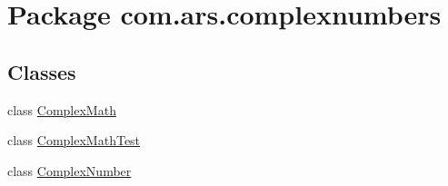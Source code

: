 \hypertarget{namespacecom_1_1ars_1_1complexnumbers}{}\section{Package com.\+ars.\+complexnumbers}
\label{namespacecom_1_1ars_1_1complexnumbers}
\subsection*{Classes}
\begin{DoxyCompactItemize}
\item 
class \hyperlink{classcom_1_1ars_1_1complexnumbers_1_1_complex_math}{Complex\+Math}
\item 
class \hyperlink{classcom_1_1ars_1_1complexnumbers_1_1_complex_math_test}{Complex\+Math\+Test}
\item 
class \hyperlink{classcom_1_1ars_1_1complexnumbers_1_1_complex_number}{Complex\+Number}
\end{DoxyCompactItemize}
